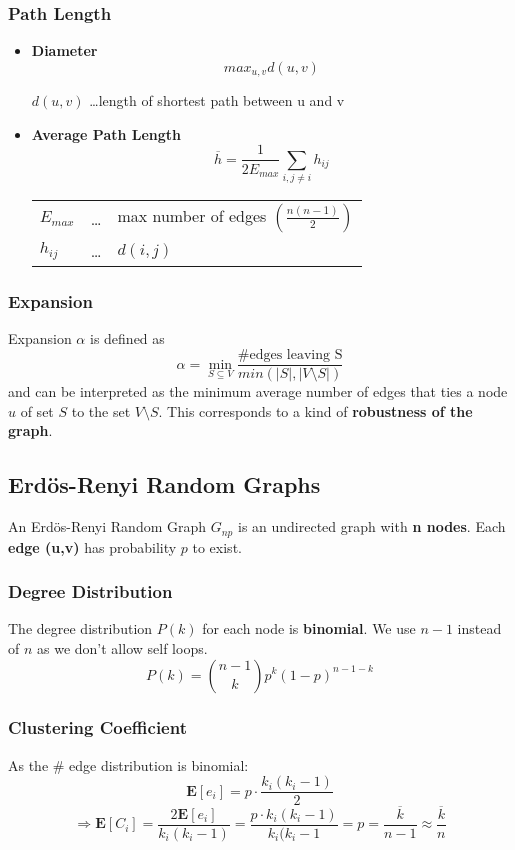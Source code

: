 \documentclass[parskip=full]{scrartcl}
\begin{document}
\subsubsection{Path Length}
\begin{itemize}
	\item[] \textbf{Diameter}\newline
		\[max_{u,v}d(u,v)\]
		\begin{center}
			$d(u,v)$ \dots length of shortest path between u and v
		\end{center}
	\item[] \textbf{Average Path Length}\newline
		\[\overline{h} = \frac{1}{2E_{max}}\sum_{i,j \neq i} h_{ij}\]
		\begin{center}
		\begin{tabular}{l c l}
			$E_{max}$ & \dots & max number of edges $\left(\frac{n(n-1)}{2}\right)$ \\
			$h_{ij}$ & \dots & $d(i,j)$
		\end{tabular}
		\end{center}
\end{itemize}

\subsubsection{Expansion}
Expansion $\alpha$ is defined as
\[\alpha = \min_{S \subseteq V}\frac{\text{\#edges leaving S}}{min(\vert S \vert, \vert V \setminus S \vert)}\]
and can be interpreted as the minimum average number of edges that ties a node $u$ of set $S$ to the set $V \setminus S$. This corresponds to a kind of \textbf{robustness of the graph}.

\subsection{Erdös-Renyi Random Graphs}
An Erdös-Renyi Random Graph \textbf{$G_{np}$} is an undirected graph with \textbf{n nodes}. Each \textbf{edge (u,v)} has probability \textbf{$p$} to exist.

\subsubsection{Degree Distribution}
The degree distribution \textbf{$P(k)$} for each node is \textbf{binomial}. We use $n-1$ instead of $n$ as we don't allow self loops.
\[P(k) = \binom{n-1}{k}p^k(1-p)^{n-1-k}\]

\subsubsection{Clustering Coefficient}
As the \# edge distribution is binomial:
\[\mathbf{E}[e_i] = p \cdot \frac{k_i(k_i - 1)}{2}\]
\[\Longrightarrow \mathbf{E}[C_i] = \frac{2\mathbf{E}[e_i]}{k_i(k_i-1)} = \frac{p \cdot k_i(k_i-1)}{k_i(k_i-1} = p = \frac{\overline{k}}{n-1} \approx \frac{\overline{k}}{n}\]
\end{document}

